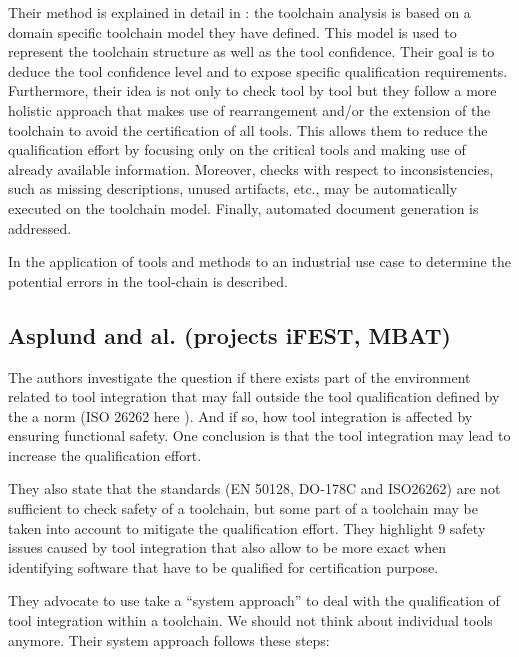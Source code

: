 Their method is explained in detail in \cite{slotosch_iso_2012}: the
toolchain analysis is based on a domain specific toolchain model
they have defined. This model is used to represent the toolchain
structure as well as the tool confidence.  Their goal is to deduce the
tool confidence level and to expose specific qualification
requirements. Furthermore, their idea is not only to check tool by
tool but they follow a more holistic approach that makes use of
rearrangement and/or the extension of the toolchain to avoid the
certification of all tools. This allows them to reduce the
qualification effort by focusing only on the critical tools and making
use of already available information.  Moreover, checks with respect to inconsistencies,
such as missing descriptions, unused artifacts, etc., may be
automatically executed on the toolchain model. Finally, automated document generation is addressed.

In \cite{wildmoser_determining_2012} the application of tools and methods to an
industrial use case to determine the potential errors in the tool-chain is described.

\subsection{Asplund and al. (projects iFEST, MBAT)}
\label{sec-1-2.2}

The authors investigate the question if there exists part of the environment related to tool
integration that may fall outside the tool qualification defined by the a norm
(ISO 26262 here \cite{asplund_qualifying_2012}). And if so, how tool integration
is affected by ensuring functional safety. One conclusion is that the tool
integration may lead to increase the qualification effort.

They also state that the standards (EN 50128, DO-178C and ISO26262)
are not sufficient to check safety of a toolchain, but some part of a
toolchain may be taken into account to mitigate the qualification
effort. 
They highlight 9 safety issues caused by tool integration that also
allow to be more exact when identifying software that have to be
qualified for certification purpose. 

They advocate to use take a ``system approach''  to deal with the qualification of tool integration within a toolchain. We should not
think about individual tools anymore.  Their system approach follows these steps:


